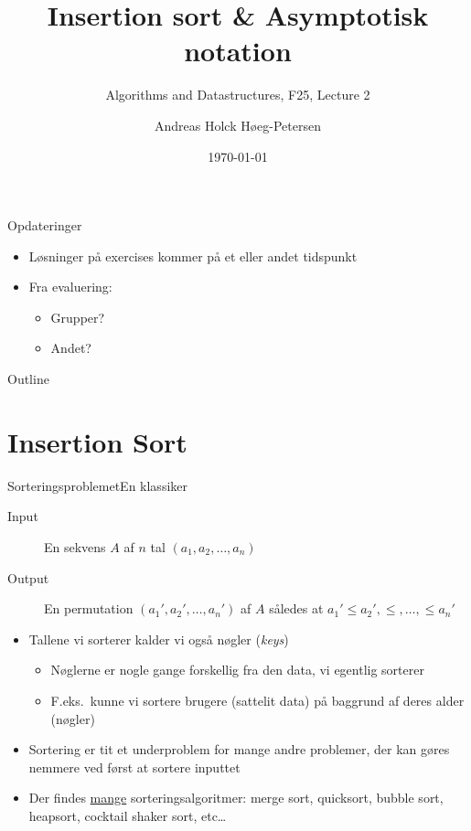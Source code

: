 \documentclass{beamer}
\title[ALG25 - Lecture 2]
{Insertion sort \& Asymptotisk notation}
\subtitle
{Algorithms and Datastructures, F25, Lecture 2}
\author[Andreas H. Høeg-Petersen]
{Andreas Holck Høeg-Petersen}
\institute[AAU]{%
  Department of Computer Science\\
  Aalborg University
}
\date {\today}
\begin{document}
\begin{frame}
  \titlepage
\end{frame}

\begin{frame}{Opdateringer}{}
    \begin{itemize}
        \item Løsninger på exercises kommer på et eller andet tidspunkt
        \item Fra evaluering:
            \begin{itemize}
                \item Grupper?
                \item Andet?
            \end{itemize}
    \end{itemize}
\end{frame}


\begin{frame}{Outline}
  \tableofcontents
\end{frame}


\section{Insertion Sort}

\begin{frame}{Sorteringsproblemet}{En klassiker}
    \begin{description}
        \item[Input] En sekvens $A$ af $n$ tal $(a_1, a_2, \ldots, a_n)$
        \item[Output] En permutation $(a_1', a_2', \ldots, a_n')$ af $A$ således
            at $a_1' \leq a_2', \leq, \ldots, \leq a_n'$ \pause
    \end{description}

    \begin{itemize}[<+->]
        \item Tallene vi sorterer kalder vi også \alert{nøgler} (\textit{keys})
            \begin{itemize}
                \item Nøglerne er nogle gange forskellig fra den data, vi
                    egentlig sorterer
                \item F.eks.\ kunne vi sortere brugere (\alert{sattelit data})
                    på baggrund af deres alder (\alert{nøgler})
            \end{itemize}
        \item Sortering er tit et underproblem for mange andre problemer, der
            kan gøres nemmere ved først at sortere inputtet
        \item Der findes \underline{mange} sorteringsalgoritmer: merge sort,
            quicksort, bubble sort, heapsort, cocktail shaker sort, etc\ldots
    \end{itemize}

\end{frame}
\end{document}
